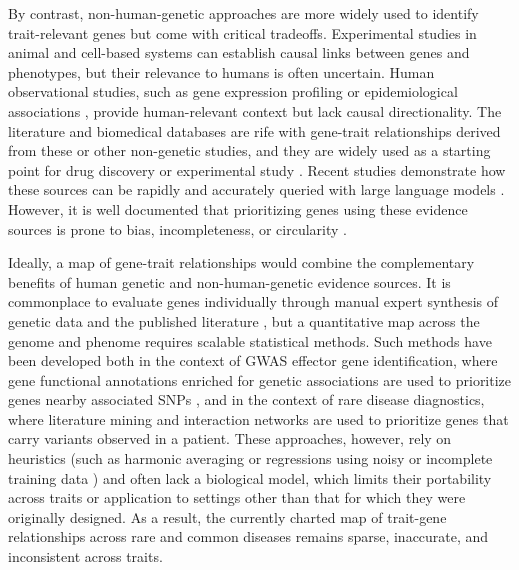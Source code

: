 By contrast, non-human-genetic approaches are more widely used to identify trait-relevant genes but come with critical tradeoffs. Experimental studies in animal \cite{seok_genomic_2013,widjaja_inhibiting_2019} and cell-based \cite{ben-david_genetic_2018,canon_clinical_2019} systems can establish causal links between genes and phenotypes, but their relevance to humans is often uncertain. Human observational studies, such as gene expression profiling \cite{wu_integrating_2022,rodriguez_machine_2021} or epidemiological associations \cite{barter_cholesteryl_2011,bhatt_cardiovascular_2019}, provide human-relevant context but lack causal directionality. The literature and biomedical databases are rife with gene-trait relationships derived from these or other non-genetic studies, and they are widely used as a starting point for drug discovery or experimental study \cite{swinney_how_2011,dornbos_evaluating_2022}. Recent studies demonstrate how these sources can be rapidly and accurately queried with large language models \cite{toufiq_harnessing_2023,hu_evaluation_2025}. However, it is well documented that prioritizing genes using these evidence sources is prone to bias, incompleteness, or circularity \cite{gillis_assessing_2013,haynes_gene_2018,stoeger_large_2018,tan_caution_2025}.

Ideally, a map of gene-trait relationships would combine the complementary benefits of human genetic and non-human-genetic evidence sources. It is commonplace to evaluate genes individually through manual expert synthesis of genetic data and the published literature \cite{mountjoy_open_2022,karjalainen_genome-wide_2024}, but a quantitative map across the genome and phenome requires scalable statistical methods. Such methods have been developed both in the context of GWAS effector gene identification, where gene functional annotations enriched for genetic associations are used to prioritize genes nearby associated SNPs \cite{pers_biological_2015,weeks_leveraging_2023}, and in the context of rare disease diagnostics, where literature mining \cite{birgmeier_amelie_2020} and interaction networks \cite{smedley_next-generation_2015} are used to prioritize genes that carry variants observed in a patient. These approaches, however, rely on heuristics (such as harmonic averaging \cite{buniello_open_2025} or regressions using noisy or incomplete training data \cite{weeks_leveraging_2023,schipper_prioritizing_2025}) and often lack a biological model, which limits their portability across traits or application to settings other than that for which they were originally designed. As a result, the currently charted map of trait-gene relationships across rare and common diseases remains sparse, inaccurate, and inconsistent across traits.

